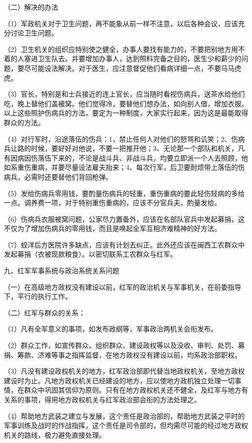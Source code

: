 （二）解决的办法

（1）军政机关对于卫生问题，再不能象从前一样不注意，以后各种会议，应该充分讨论卫生问题。

（2）卫生机关的组织应特别使之健全，办事人要找有能力的，不要把别地方用不着的人塞进卫生队去。并要增加办事人，达到照料完备之目的，医生少和薪少的问题，要尽可能设法解决。对于医生，应注意督促他们看病详细一点，不要马马虎虎。

（3）官长，特别是和士兵接近的连上官长，应当随时看视伤病兵，送茶水给他们吃，晚上替他们盖被窝。他们觉得冷，要替他们想办法，如向别人借，增加衣服。以上这些照护伤病兵的方法，要定为一种制度，大家实行起来，因为这是最能取得群众的方法。

（4）对行军时，沿途落伍的伤兵：1，禁止任何人对他们的怒骂和讥笑；2、伤病兵让路的时候，要好好对他说，不要一把推开他；3、无论那一个部队和机关，凡有因病因伤落伍下来的，不论是战斗兵、非战斗兵，均要立即派一个人去照顾，他如系重伤重病，并要尽量设法雇夫抬来；4、每次行军，后卫要耐烦带上落伍的伤病兵，必需时还要替他们背回枪弹。

（5）发给伤病兵零用钱，要酌量伤病兵的轻重，重伤重病的要此轻伤轻病的多给一点。调养费一项，对于特别重伤重病的，应该不分官兵夫，酌量发给。

（6）伤病兵衣服被窝问题，公家尽力置备外，应该在名部队官兵中发起募捐，这不仅为了增加伤病兵的零用钱，而且是唤起全军互相济难精神的好方法。

（7）蛟洋后方医院许多缺点，应该有计划去纠正。此外还应该在闽西工农群众中发起募捐（衣被现款粮食）。以密切联系工农群众与红军。

九、红军军事系统与政治系统关系问题

（一）在高级地方政权没有建设以前，红军的政治机关与军事机关，在前委指导下，平行的执行工作。

（二）红军与群众的关系：

（1）凡有全军意义的事项，如发布政纲等，军事政治两机关会衔发布。

（2）群众工作，如宣传群众、组织群众、建设政权等以及没收、审判、处罚、募捐、筹款、济难等事之指挥监督，在地方政权没有建设以前，均系政治部职权。

（3）凡没有建设政权机关的地方，红军政治部即代替当地政权机关，至地方政权建设时为止。凡地方政权机关已经建设的地方，应以使地方政机独立处理一切事情，在群众中巩固其信仰为原则。只有在地方政权机关还不健全，及红军与地方有关系的事项，得用地方政权机关与红军政治部会衔的方法处理之。

（4）帮助地方武装之建立与发展，这个责任是政治部的，帮助地方武装之平时的军事训练及战时的作战指挥，这个责任是司令部的，但均需尽可能的经过地方政权机关的路线，极力避免直接处理。

